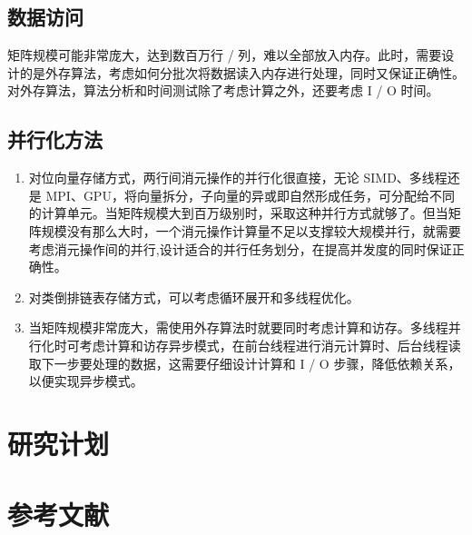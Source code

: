 \documentclass[a4paper]{article}
\begin{document}
\subsection{数据访问}

矩阵规模可能非常庞大，达到数百万行 / 列，难以全部放入内存。此时，需要设计的是外存算法，考虑如何分批次将数据读入内存进行处理，同时又保证正确性。对外存算法，算法分析和时间测试除了考虑计算之外，还要考虑 I / O 时间。

\subsection{并行化方法}

\begin{enumerate}
  \item 对位向量存储方式，两行间消元操作的并行化很直接，无论 SIMD、多线程还是 MPI、GPU，将向量拆分，子向量的异或即自然形成任务，可分配给不同的计算单元。当矩阵规模大到百万级别时，采取这种并行方式就够了。但当矩阵规模没有那么大时，一个消元操作计算量不足以支撑较大规模并行，就需要考虑消元操作间的并行,设计适合的并行任务划分，在提高并发度的同时保证正确性。
  \item 对类倒排链表存储方式，可以考虑循环展开和多线程优化。
  \item 当矩阵规模非常庞大，需使用外存算法时就要同时考虑计算和访存。多线程并行化时可考虑计算和访存异步模式，在前台线程进行消元计算时、后台线程读取下一步要处理的数据，这需要仔细设计计算和 I / O 步骤，降低依赖关系，以便实现异步模式。
\end{enumerate}

\section{研究计划}

\newpage

\section{参考文献}
\cite{1}\cite{2}



\end{document}

